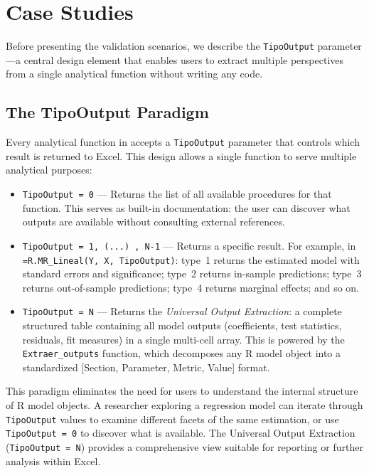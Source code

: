 
\section{Case Studies}
\label{sec:case_studies}

Before presenting the validation scenarios, we describe the \texttt{TipoOutput} parameter---a central design element that enables users to extract multiple perspectives from a single analytical function without writing any code.

\subsection{The TipoOutput Paradigm}
\label{subsec:tipooutput}

Every analytical function in \neven{} accepts a \texttt{TipoOutput} parameter that controls which result is returned to Excel. This design allows a single function to serve multiple analytical purposes:

\begin{itemize}
    \item \texttt{TipoOutput = 0} --- Returns the list of all available procedures for that function. This serves as built-in documentation: the user can discover what outputs are available without consulting external references.
    \item \texttt{TipoOutput = 1, (...) , N-1} --- Returns a specific result. For example, in \texttt{=R.MR\_Lineal(Y, X, TipoOutput)}: type~1 returns the estimated model with standard errors and significance; type~2 returns in-sample predictions; type~3 returns out-of-sample predictions; type~4 returns marginal effects; and so on.
    \item \texttt{TipoOutput = N} --- Returns the \emph{Universal Output Extraction}: a complete structured table containing all model outputs (coefficients, test statistics, residuals, fit measures) in a single multi-cell array. This is powered by the \texttt{Extraer\_outputs} function, which decomposes any R model object into a standardized [Section, Parameter, Metric, Value] format.
\end{itemize}

This paradigm eliminates the need for users to understand the internal structure of R model objects. A researcher exploring a regression model can iterate through \texttt{TipoOutput} values to examine different facets of the same estimation, or use \texttt{TipoOutput = 0} to discover what is available. The Universal Output Extraction (\texttt{TipoOutput = N}) provides a comprehensive view suitable for reporting or further analysis within Excel.

